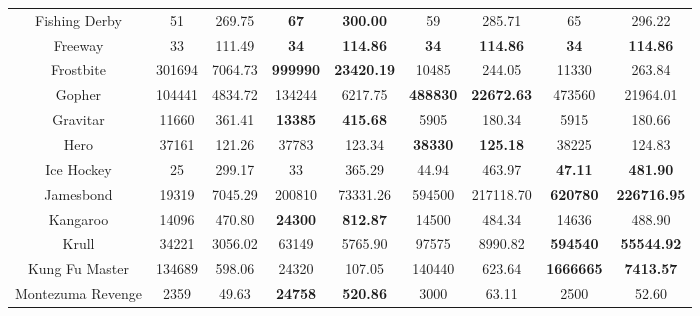 \documentclass[nohyperref]{article}
\newcommand{\best}[1]{\textbf{#1}}
\theoremstyle{plain}
\begin{document}
\begin{table}[!hb]
\begin{center}
\begin{tabular}{|c |c c| c c| c c |c c|}
 Fishing Derby   &51           &269.75             &\textbf{67}            &\textbf{300.00}                & 59                &285.71                  &65               &296.22\\
 Freeway         &33           &111.49             &\textbf{34}            &\textbf{114.86}                & \best{34}         &\best{114.86}           &\textbf{34}        &\textbf{114.86}\\
 Frostbite       &301694       &7064.73            &\textbf{999990}       &\textbf{23420.19}              & 10485             &244.05                   &11330	            &263.84\\
 Gopher          &104441       &4834.72            &134244                &6217.75                        & \best{488830}     &\best{22672.63}          &473560           &21964.01\\
 Gravitar        &11660        &361.41             &\textbf{13385}        &\textbf{415.68}                & 5905              &180.34                   &5915             &180.66\\
 Hero            &37161        &121.26            &37783                  &123.34                         & \textbf{38330}      &\textbf{125.18}            &38225	   &124.83\\
 Ice Hockey      &25           &299.17             &33                     &365.29                         & 44.94         &463.97        &\textbf{47.11}           &\textbf{481.90}    \\
 Jamesbond       &19319        &7045.29            &200810                &73331.26                       & 594500     &217118.70         &\textbf{620780	}          &\textbf{226716.95}\\
 Kangaroo        &14096        &470.80             &\textbf{24300}        &\textbf{812.87}                & 14500             &484.34                   &14636           &488.90\\
 Krull           &34221        &3056.02            &63149                 &5765.90                        & 97575      &8990.82           &\textbf{594540}          &\textbf{55544.92}\\
 Kung Fu Master  &134689       &598.06             &24320                 &107.05                         & 140440     &623.64            &\textbf{1666665	}          &\textbf{7413.57}\\
 Montezuma Revenge  &2359      &49.63               &\textbf{24758}        &\textbf{520.86}                & 3000              &63.11                   &2500            &52.60\\

\end{tabular}
\end{center}
\end{table}
\end{document}
